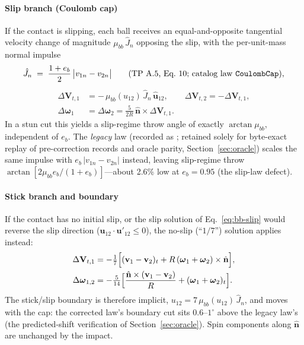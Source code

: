 \paragraph{Slip branch (Coulomb cap)} If the contact is slipping, each
ball receives an equal-and-opposite tangential velocity change of
magnitude $\mu_{bb}\,\hat{J}_n$ opposing the slip, with the
per-unit-mass normal impulse
\begin{equation}
\hat{J}_n \;=\; \frac{1+e_b}{2}\,\bigl|v_{1n} - v_{2n}\bigr|
\qquad \text{(TP~A.5, Eq.~10; catalog law \code{CoulombCap})},
\label{eq:bb-cap}
\end{equation}
\begin{align}
\Delta\mathbf{V}_{t,1} &= -\,\mu_{bb}(u_{12})\,\hat{J}_n\,
\hat{\mathbf{u}}_{12},
\qquad
\Delta\mathbf{V}_{t,2} = -\Delta\mathbf{V}_{t,1},
\label{eq:bb-slip}\\
\Delta\boldsymbol{\omega}_{1} &= \Delta\boldsymbol{\omega}_{2}
= \frac{5}{2R}\,\hat{\mathbf{n}} \times \Delta\mathbf{V}_{t,1}.
\nonumber
\end{align}
In a stun cut this yields a slip-regime throw angle of exactly
$\arctan \mu_{bb}$, independent of $e_b$. The \emph{legacy} law
(recorded as ; retained solely for
byte-exact replay of pre-correction records and oracle parity,
Section~\ref{sec:oracle}) scales the same impulse with
$e_b\,|v_{1n}-v_{2n}|$ instead, leaving slip-regime throw
$\arctan[2\mu_{bb}e_b/(1+e_b)]$---about 2.6\% low at $e_b=0.95$ (the
slip-law defect).

\paragraph{Stick branch and boundary} If the contact has no initial
slip, or the slip solution of Eq.~\eqref{eq:bb-slip} would reverse the
slip direction ($\mathbf{u}_{12}\cdot\mathbf{u}'_{12} \le 0$), the
no-slip (``$1/7$'') solution applies instead:
\begin{align}
\Delta\mathbf{V}_{t,1} &= -\tfrac{1}{7}\Bigl[(\mathbf{v}_1 -
\mathbf{v}_2)_t + R\,(\boldsymbol{\omega}_1 +
\boldsymbol{\omega}_2)\times\hat{\mathbf{n}}\Bigr],
\label{eq:bb-stick}\\
\Delta\boldsymbol{\omega}_{1,2} &=
-\tfrac{5}{14}\Bigl[\frac{\hat{\mathbf{n}}\times(\mathbf{v}_1 -
\mathbf{v}_2)}{R} + (\boldsymbol{\omega}_1 +
\boldsymbol{\omega}_2)_t\Bigr].
\nonumber
\end{align}
The stick/slip boundary is therefore implicit,
$u_{12} = 7\,\mu_{bb}(u_{12})\,\hat{J}_n$, and moves with the cap: the
corrected law's boundary cut sits $0.6$--$1^\circ$ above the legacy
law's (the predicted-shift verification of Section~\ref{sec:oracle}).
Spin components along $\hat{\mathbf{n}}$ are unchanged by the impact.

